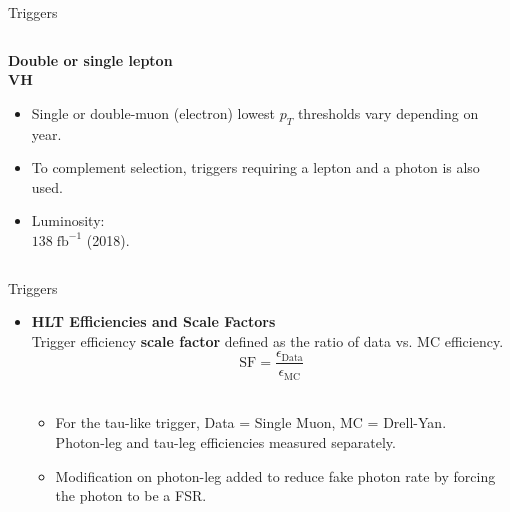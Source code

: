 \documentclass[9pt,aspectratio=1610]{beamer}
\newcommand{\pt}{\ensuremath{p_T}}
\newcommand{\khl}[1]{\textbf{\color{structure}#1}}
\begin{document}
\begin{frame}{Triggers}
\begin{columns}
\begin{column}[t]{0.33\linewidth}
{				\textbf{Double or single lepton}\\
				\hspace{2em}\textrightarrow\hspace{0.5em}\textbf{\color{RoyalBlue}VH}
				\begin{itemize}
					\item Single or double-muon (electron) lowest \(\pt\) thresholds vary depending on year.
					\item To complement selection, triggers requiring a lepton and a photon is also used.
					\item Luminosity:\\\(138\;\mathrm{fb^{-1}}\) (2018).
				\end{itemize}
			}
			\vfill
		\end{column}
	\end{columns}
\end{frame}

\begin{frame}{Triggers}
	\begin{itemize}
		\item \khl{HLT Efficiencies and Scale Factors}\\
		Trigger efficiency \textbf{scale factor} defined as the ratio of data vs. MC efficiency.
		\begin{equation*}
			\text{SF} = \frac{\epsilon_\text{Data}}{\epsilon_\text{MC}}
		\end{equation*}\\
		\begin{itemize}
			\item For the tau-like trigger, Data = Single Muon, MC = Drell-Yan.\\ Photon-leg and tau-leg efficiencies measured separately.\\
			\item Modification on photon-leg added to reduce fake photon rate by forcing the photon to be a FSR.
		\end{itemize}		
	\end{itemize}
\end{frame}
\end{document}
